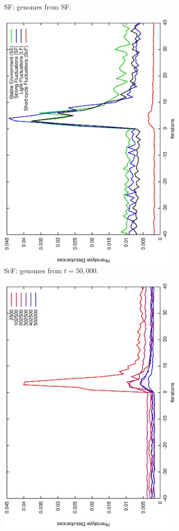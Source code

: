 \begin{figure}[h]
\begin{subfigure}{.25\textwidth}
 \caption{SF: genomes from SF.}
 \label{fig:transli}
\end{subfigure}
\begin{subfigure}{.25\textwidth}
 \centering
 \includegraphics[width=.7\linewidth, angle =-90]{img/Sucavg499999variationSmallb.eps}
 \caption{ScF: genomes from $t\!=\!50,000$.}
 \label{fig:transstest}
\end{subfigure}%
\begin{subfigure}{.25\textwidth}
 \centering
 \includegraphics[width=.7\linewidth, angle =-90]{img/SucavgvarSmallValidvariationSmallb.eps}

\end{subfigure}
\end{figure}
